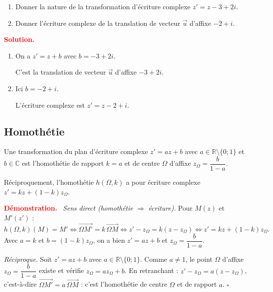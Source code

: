 \documentclass[12pt,a4paper]{article}
\newcommand{\C}{\mathbb{C}}
\newcommand{\R}{\mathbb{R}}
\newcommand{\zO}{z_{\Omega}}
\newenvironment{demo}
  {\par\smallskip\noindent\textbf{\textcolor{red}{Démonstration.}}\ }
  {\hfill$\square$\par\smallskip}
\newcommand{\solution}{\par\smallskip\noindent\textbf{\textcolor{red}{Solution.}}\par}
\begin{document}
\begin{exo}
\begin{enumerate}
  \item Donner la nature de la transformation d'écriture complexe $z'=z-3+2i$.
  \item Donner l'écriture complexe de la translation de vecteur $\vec u$ d'affixe $-2+i$.
\end{enumerate}
\end{exo}

\solution
\begin{enumerate}
  \item On a $z'=z+b$ avec $b=-3+2i$.
  \begin{resultat}
  C'est la translation de vecteur $\vec u$ d'affixe $-3+2i$.
  \end{resultat}
  \item Ici $b=-2+i$.
  \begin{resultat}
  L'écriture complexe est $z'=z-2+i$.
  \end{resultat}
\end{enumerate}

\subsection{Homothétie}

\begin{prop}
Une transformation du plan d'écriture complexe $z'=az+b$ avec $a\in\R\setminus\{0;1\}$ et $b\in\C$
est l'homothétie de rapport $k=a$ et de centre $\Omega$ d'affixe $\zO=\dfrac{b}{1-a}$.

Réciproquement, l'homothétie $h(\Omega,k)$ a pour écriture complexe $z'=kz+(1-k)\zO$.
\end{prop}

\begin{demo}
\emph{Sens direct (homothétie $\Rightarrow$ écriture).} Pour $M(z)$ et $M'(z')$ :
\[
h(\Omega,k)(M)=M' \iff \overrightarrow{\Omega M'}=k\,\overrightarrow{\Omega M}
\iff z'-\zO=k(z-\zO)\iff z'=kz+(1-k)\zO .
\]
Avec $a=k$ et $b=(1-k)\zO$, on a bien $z'=az+b$ et $\zO=\dfrac{b}{1-a}$.

\emph{Réciproque.} Soit $z'=az+b$ avec $a\in\R\setminus\{0;1\}$. Comme $a\neq1$, le point $\Omega$ d'affixe
$\zO=\dfrac{b}{1-a}$ existe et vérifie $\zO=a\zO+b$. En retranchant : $z'-\zO=a(z-\zO)$, c'est-à-dire
$\overrightarrow{\Omega M'}=a\,\overrightarrow{\Omega M}$ : c'est l'homothétie de centre $\Omega$ et de rapport $a$.
\end{demo}
\end{document}
